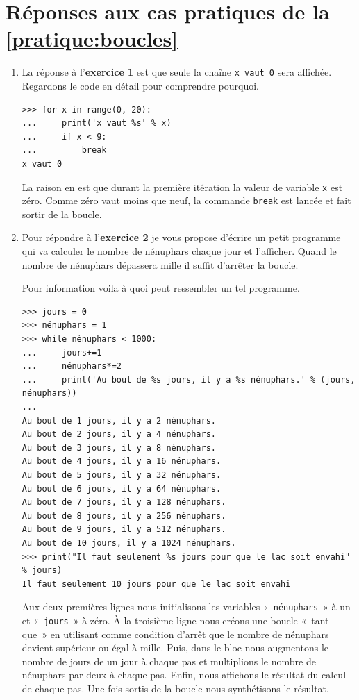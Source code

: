 \section{Réponses aux cas pratiques de la \autoref{pratique:boucles}\label{reponses:boucles}}
\begin{enumerate}
\item La réponse à l'\textbf{exercice 1} est que seule la chaîne \texttt{x vaut 0} sera affichée. Regardons le code en détail pour comprendre pourquoi.
\begin{Verbatim}[frame=single,rulecolor=\color{gray}, label=ne pas taper]
>>> for x in range(0, 20):
... 	print('x vaut %s' % x)
... 	if x < 9:
... 		break
x vaut 0
\end{Verbatim}

La raison en est que durant la première itération la valeur de variable \texttt{x} est zéro. Comme zéro vaut moins que neuf, la commande \texttt{break} est lancée et fait sortir de la boucle.

\item Pour répondre à l'\textbf{exercice 2} je vous propose d'écrire un petit programme qui va calculer le nombre de nénuphars chaque jour et l'afficher. Quand le nombre de nénuphars dépassera mille il suffit d'arrêter la boucle.

Pour information voila à quoi peut ressembler un tel programme.
\begin{Verbatim}[frame=single,rulecolor=\color{gray}, label=ne pas taper]
>>> jours = 0
>>> nénuphars = 1
>>> while nénuphars < 1000:
...     jours+=1
...     nénuphars*=2 
...     print('Au bout de %s jours, il y a %s nénuphars.' % (jours, nénuphars))
... 
Au bout de 1 jours, il y a 2 nénuphars.
Au bout de 2 jours, il y a 4 nénuphars.
Au bout de 3 jours, il y a 8 nénuphars.
Au bout de 4 jours, il y a 16 nénuphars.
Au bout de 5 jours, il y a 32 nénuphars.
Au bout de 6 jours, il y a 64 nénuphars.
Au bout de 7 jours, il y a 128 nénuphars.
Au bout de 8 jours, il y a 256 nénuphars.
Au bout de 9 jours, il y a 512 nénuphars.
Au bout de 10 jours, il y a 1024 nénuphars.
>>> print("Il faut seulement %s jours pour que le lac soit envahi" % jours)
Il faut seulement 10 jours pour que le lac soit envahi
\end{Verbatim}

Aux deux premières lignes nous initialisons les variables «~\verb+nénuphars+~» à un et «~\verb+jours+~» à zéro.  
À la troisième ligne nous créons une boucle «~tant que~» en utilisant comme condition d'arrêt que le nombre de nénuphars devient supérieur ou égal à mille. Puis, dans le bloc nous augmentons le nombre de jours de un jour à chaque pas et multiplions le nombre de nénuphars par deux à chaque pas. Enfin, nous affichons le résultat du calcul de chaque pas. Une fois sortis de la boucle nous synthétisons le résultat. 
\end{enumerate}

